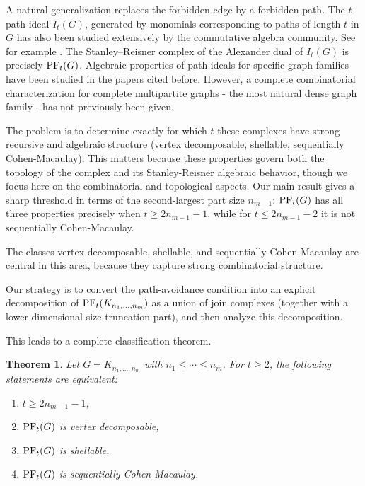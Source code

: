 \documentclass[12pt,reqno]{amsart}
\newtheorem{theorem}[theorem]{Theorem}
\theoremstyle{definition}
\newcommand{\PF}{{\rm PF}}
\begin{document}
A natural generalization replaces the forbidden edge by a forbidden path. 
The $t$-path ideal $I_t(G)$, generated by monomials corresponding to paths of length $t$ in $G$ has also been studied extensively by the commutative algebra community. 
See for example \cite{Bi, ConcaDeNegri1999, AKK, AH, SM}. 
The Stanley–Reisner complex of the Alexander dual of $I_t(G)$ is precisely $\PF_t(G)$. 
Algebraic properties of path ideals for specific graph families have been studied in the papers cited before. 
However, a complete combinatorial characterization for complete multipartite graphs - the most natural dense graph family - has not previously been given.

The problem is to determine exactly for which $t$ these complexes have strong
recursive and algebraic structure (vertex decomposable, shellable,
sequentially Cohen-Macaulay). This matters because these properties govern
both the topology of the complex and its Stanley-Reisner algebraic behavior, though we focus here on the combinatorial and topological aspects.
Our main result gives a sharp threshold in terms of the second-largest part
size $n_{m-1}$: $\PF_t(G)$ has all three properties precisely when
$t\ge 2n_{m-1}-1$, while for $t\le 2n_{m-1}-2$ it is not sequentially
Cohen-Macaulay.

The classes vertex decomposable, shellable, and sequentially
Cohen-Macaulay are central in this area, because they capture strong
combinatorial structure. 
 
Our strategy is to convert the path-avoidance condition into an explicit decomposition of $\PF_t(K_{n_1,\dots,n_m})$ as a union of join complexes (together with a lower-dimensional size-truncation part), and then analyze this decomposition.

This leads to a complete classification theorem.

\begin{theorem}\label{thm: VDC - CBG}
Let $G=K_{n_1,\dots,n_m}$ with $n_1\le\cdots\le n_m$. For $t\ge 2$, the following statements are equivalent:
\begin{enumerate}
\item $t\ge 2n_{m-1}-1$,
\item $\PF_t(G)$ is vertex decomposable,
\item $\PF_t(G)$ is shellable,
\item $\PF_t(G)$ is sequentially Cohen-Macaulay.
\end{enumerate}
\end{theorem}
\end{document}
